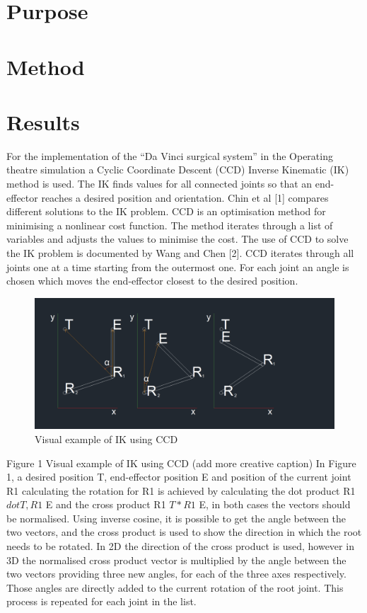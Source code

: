 \section{Purpose}
 

\section{Method}

\section{Results}
For the implementation of the “Da Vinci surgical system” in the Operating theatre simulation a Cyclic Coordinate Descent (CCD) Inverse Kinematic (IK) method is used. The IK finds values for all connected joints so that an end-effector reaches a desired position and orientation. Chin et al [1] compares different solutions to the IK problem. CCD is an optimisation method for minimising a nonlinear cost function. The method iterates through a list of variables and adjusts the values to minimise the cost. The use of CCD to solve the IK problem is documented by Wang and Chen [2]. CCD iterates through all joints one at a time starting from the outermost one. For each joint an angle is chosen which moves the end-effector closest to the desired position.
\begin{figure}[h]
\centering
\includegraphics[scale=1]{CCD/IKCCD.png}
\caption{Visual example of IK using CCD }
\end{figure}
Figure 1 Visual example of IK using CCD (add more creative caption)
In Figure 1, a desired position T, end-effector position E and position of the current joint R1 calculating the rotation for R1 is achieved by calculating the dot product R1 $dot{T,R1}$ E and the cross product R1 $T*R1$ E, in both cases the vectors should be normalised. Using inverse cosine, it is possible to get the angle between the two vectors, and the cross product is used to show the direction in which the root needs to be rotated. In 2D the direction of the cross product is used, however in 3D the normalised cross product vector is multiplied by the angle between the two vectors providing three new angles, for each of the three axes respectively. Those angles are directly added to the current rotation of the root joint. This process is repeated for each joint in the list.

